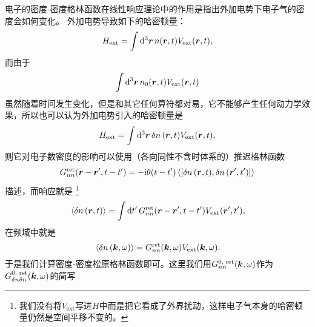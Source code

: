 电子的密度-密度格林函数在线性响应理论中的作用是指出外加电势下电子气的密度会如何变化。
外加电势导致如下的哈密顿量：
\[
    {H}_\text{ext} = \int \dd[3]{\vb*{r}} {n}(\vb*{r}, t) V_\text{ext} (\vb*{r}, t),
\]
而由于
\[
    \int \dd[3]{\vb*{r}} n_0(\vb*{r}, t) V_\text{ext}(\vb*{r}, t)
\]
虽然随着时间发生变化，但是和其它任何算符都对易，它不能够产生任何动力学效果，所以也可以认为外加电势引入的哈密顿量是
\[
    {H}_\text{ext} = \int \dd[3]{\vb*{r}} \var{n}(\vb*{r}, t) V_\text{ext} (\vb*{r}, t),
\]
则它对电子数密度的影响可以使用（各向同性不含时体系的）推迟格林函数
\[
    G^\text{ret}_{nn}(\vb*{r}-\vb*{r}', t-t') = - \ii \theta(t-t') \expval*{\comm{\var{{n}}(\vb*{r}, t)}{\var{{n}}(\vb*{r}', t')}}
\]
描述，而响应就是%
\footnote{我们没有将$V_\text{ext}$写进${H}$中而是把它看成了外界扰动，这样电子气本身的哈密顿量仍然是空间平移不变的。}%
\begin{equation}
    \expval*{\var{{n}}(\vb*{r}, t)} = \int \dd{t'} G^\text{ret}_{nn}(\vb*{r}-\vb*{r}', t-t') V_\text{ext}(\vb*{r}', t'),
\end{equation}
在频域中就是
\begin{equation}
    \expval*{\var{{n}}(\vb*{k}, \omega)} = G^\text{ret}_{nn}(\vb*{k}, \omega) V_\text{ext}(\vb*{k}, \omega).
    \label{eq:green-function-electro-shielding}
\end{equation}
于是我们计算密度-密度松原格林函数即可。这里我们用$G^\text{0, ret}_{nn} (\vb*{k}, \omega)$作为$G^\text{0, ret}_{\var{n}\var{n}} (\vb*{k}, \omega)$的简写

